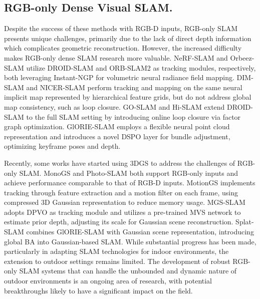 \subsection{RGB-only Dense Visual SLAM. }

Despite the success of these methods with RGB-D inputs, RGB-only SLAM presents unique challenges, primarily due to the lack of direct depth information which complicates geometric reconstruction. However, the increased difficulty makes RGB-only dense SLAM research more valuable. NeRF-SLAM \cite{rosinol2023nerfslam} and Orbeez-SLAM \cite{chung2023orbeez-slam} utilize DROID-SLAM \cite{teed2021droid-slam} and ORB-SLAM2 \cite{mur2017orb-slam2} as tracking modules, respectively, both leveraging Instant-NGP \cite{muller2022instant-ngp} for volumetric neural radiance field mapping. DIM-SLAM \cite{li2023densedim-slam} and NICER-SLAM \cite{zhu2024nicer} perform tracking and mapping on the same neural implicit map represented by hierarchical feature grids, but do not address global map consistency, such as loop closure. GO-SLAM \cite{zhang2023goslam} and Hi-SLAM \cite{zhang2023hislam} extend DROID-SLAM \cite{teed2021droid-slam} to the full SLAM setting by introducing online loop closure via factor graph optimization. GlORIE-SLAM \cite{zhang2024glorie} employs a flexible neural point cloud representation and introduces a novel DSPO layer for bundle adjustment, optimizing keyframe poses and depth.

Recently, some works have started using 3DGS to address the challenges of RGB-only SLAM. MonoGS \cite{matsuki2024gaussianmonogs} and Photo-SLAM \cite{huang2024photo} both support RGB-only inputs and achieve performance comparable to that of RGB-D inputs. MotionGS \cite{guo2024motiongs} implements tracking through feature extraction and a motion filter on each frame, using compressed 3D Gaussian representation to reduce memory usage. MGS-SLAM \cite{zhu2024mgs-slam} adopts DPVO \cite{teed2023deepdpvo} as tracking module and utilizes a pre-trained MVS network to estimate prior depth, adjusting its scale for Gaussian scene reconstruction. Splat-SLAM \cite{sandstrom2024splat-slam} combines GlORIE-SLAM \cite{zhang2024glorie} with Gaussian scene representation, introducing global BA into Gaussian-based SLAM. 
While substantial progress has been made, particularly in adapting SLAM technologies for indoor environments, the extension to outdoor settings remains limited. The development of robust RGB-only SLAM systems that can handle the unbounded and dynamic nature of outdoor environments is an ongoing area of research, with potential breakthroughs likely to have a significant impact on the field.